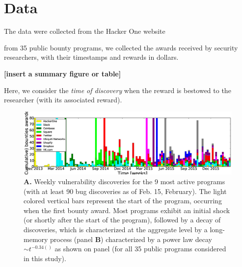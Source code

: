 \section{Data}
\label{sec:data}
The data were collected from the Hacker One website

from 35 public bounty programs, we collected the awards received by security researchers, with their timestamps and rewards in dollars.

{\bf [insert a summary figure or table]}




Here, we consider the {\it time of discovery} when the reward is bestowed to the researcher (with its associated reward).



\begin{figure}
\begin{center}
\includegraphics[width=17cm]{figures/timeline.eps}
\caption{{\bf A.} Weekly vulnerability discoveries for the 9 most active programs (with at least 90 bug discoveries as of Feb. 15, February). The light colored vertical bars represent the start of the program, occurring when the first bounty award. Most programs exhibit an initial shock (or shortly after the start of the program), followed by a decay of discoveries, which is characterized at the aggregate level by a long-memory process (panel {\bf B}) characterized by a power law decay $\sim t^{-0.34()}$ as shown on panel  (for all 35 public programs considered in this study).}
\label{ }
\end{center}
\end{figure}





